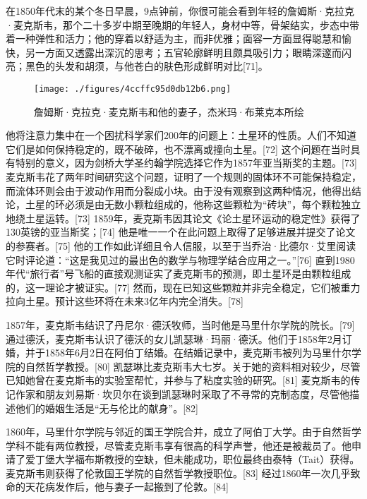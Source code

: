 在1850年代末的某个冬日早晨，9点钟前，你很可能会看到年轻的詹姆斯·克拉克·麦克斯韦，那个二十多岁中期至晚期的年轻人，身材中等，骨架结实，步态中带着一种弹性和活力；他的穿着以舒适为主，而非优雅；面容一方面显得聪慧和愉快，另一方面又透露出深沉的思考；五官轮廓鲜明且颇具吸引力；眼睛深邃而闪亮；黑色的头发和胡须，与他苍白的肤色形成鲜明对比[71]。
\begin{figure}[ht]
\centering
\texttt{[image: ./figures/4ccffc95d0db12b6.png]}
\caption{詹姆斯·克拉克·麦克斯韦和他的妻子，杰米玛·布莱克本所绘} \label{fig_Clerk_5}
\end{figure}
他将注意力集中在一个困扰科学家们200年的问题上：土星环的性质。人们不知道它们是如何保持稳定的，既不破碎，也不漂离或撞向土星。[72] 这个问题在当时具有特别的意义，因为剑桥大学圣约翰学院选择它作为1857年亚当斯奖的主题。[73] 麦克斯韦花了两年时间研究这个问题，证明了一个规则的固体环不可能保持稳定，而流体环则会由于波动作用而分裂成小块。由于没有观察到这两种情况，他得出结论，土星的环必须是由无数小颗粒组成的，他称这些颗粒为“砖块”，每个颗粒独立地绕土星运转。[73] 1859年，麦克斯韦因其论文《论土星环运动的稳定性》获得了130英镑的亚当斯奖；[74] 他是唯一一个在此问题上取得了足够进展并提交了论文的参赛者。[75] 他的工作如此详细且令人信服，以至于当乔治·比德尔·艾里阅读它时评论道：“这是我见过的最出色的数学与物理学结合应用之一。”[76] 直到1980年代“旅行者”号飞船的直接观测证实了麦克斯韦的预测，即土星环是由颗粒组成的，这一理论才被证实。[77] 然而，现在已知这些颗粒并非完全稳定，它们被重力拉向土星。预计这些环将在未来3亿年内完全消失。[78]

1857年，麦克斯韦结识了丹尼尔·德沃牧师，当时他是马里什尔学院的院长。[79] 通过德沃，麦克斯韦认识了德沃的女儿凯瑟琳·玛丽·德沃。他们于1858年2月订婚，并于1858年6月2日在阿伯丁结婚。在结婚记录中，麦克斯韦被列为马里什尔学院的自然哲学教授。[80] 凯瑟琳比麦克斯韦大七岁。关于她的资料相对较少，尽管已知她曾在麦克斯韦的实验室帮忙，并参与了粘度实验的研究。[81] 麦克斯韦的传记作家和朋友刘易斯·坎贝尔在谈到凯瑟琳时采取了不寻常的克制态度，尽管他描述他们的婚姻生活是“无与伦比的献身”。[82]

1860年，马里什尔学院与邻近的国王学院合并，成立了阿伯丁大学。由于自然哲学学科不能有两位教授，尽管麦克斯韦享有很高的科学声誉，他还是被裁员了。他申请了爱丁堡大学福布斯教授的空缺，但未能成功，职位最终由泰特（Tait）获得。麦克斯韦则获得了伦敦国王学院的自然哲学教授职位。[83] 经过1860年一次几乎致命的天花病发作后，他与妻子一起搬到了伦敦。[84]
